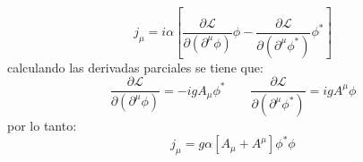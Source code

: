 \begin{itemize}
\begin{equation*}
         j_\mu = i\alpha\left[ \frac{\partial \mathcal{L}}{\partial (\partial^\mu \phi)} \phi  - \frac{\partial \mathcal{L}}{\partial (\partial^\mu {\phi}^*)} {\phi}^* \right]
     \end{equation*}
     calculando las derivadas parciales se tiene que:
     \begin{equation*}
        \frac{\partial \mathcal{L}}{\partial (\partial^\mu \phi)} = -igA_\mu \phi^*  \qquad \frac{\partial \mathcal{L}}{\partial (\partial^\mu \phi^*)} = i g A^\mu \phi
     \end{equation*}
     por lo tanto:
     \begin{equation*}
         j_\mu = g\alpha \left[A_\mu +A^\mu \right] \phi^*\phi
     \end{equation*}
\end{itemize}